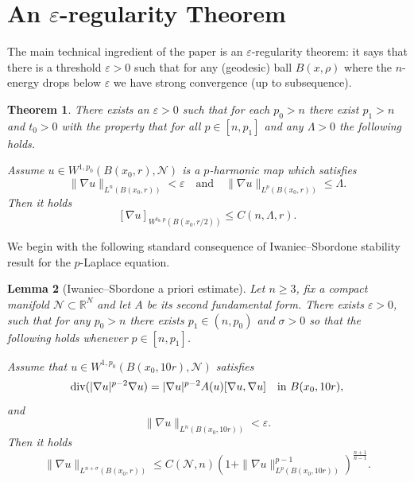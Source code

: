 \documentclass[12pt]{amsart}
\def\eps{\varepsilon}
\def\B{{B}}
\def\n{{\mathcal M}}
\def\n{{\mathcal{M}}}
\def\n{{\mathcal N}}
\renewcommand{\div}{{\rm div}}
\newtheorem{theorem}{Theorem}
\newtheorem{lemma}[theorem]{Lemma}
\newcommand{\R}{\mathbb{R}}
\newcommand{\brac}[1]{\left (#1 \right )}
\numberwithin{theorem}{section} \numberwithin{equation}{section}
\begin{document}
\section{An \texorpdfstring{$\eps$}{eps}-regularity Theorem}\label{s:epsreg}
The main technical ingredient of the paper is an $\eps$-regularity theorem: it says that there is a threshold $\eps > 0$ such that for any (geodesic) ball $B(x,\rho)$ where the $n$-energy drops below $\eps$ we have strong convergence (up to subsequence).

\begin{theorem}\label{th:epsreg}
There exists an $\eps > 0$ such that for each $p_0>n$ there exist $p_1 > n$ and $t_0 > 0$ with the property that for all $p \in [n,p_1]$ and any $\Lambda > 0$ the following holds.

Assume $u \in W^{1,p_0}(B(x_0,r),\n)$ is a $p$-harmonic map which satisfies
\[
 \|\nabla u\|_{L^n(B(x_0,r))} < \eps \quad \text{and} \quad
\|\nabla u\|_{L^p(B(x_0,r))} \leq \Lambda.
\]
Then it holds
\[
 [\nabla u]_{W^{t_0,p}(B(x_0,r/2))} \leq C(n,\Lambda,r).
\]
\end{theorem}

We begin with the following standard consequence of Iwaniec--Sbordone stability result \cite[Theorem 4]{Iwaniec-Sbordone} for the $p$-Laplace equation.
\begin{lemma}[Iwaniec--Sbordone a priori estimate]\label{la:iwaniec}
Let $n\geq 3$, fix a compact manifold $\n\subset \R^N$ and let $A$ be its second fundamental form. There exists $\eps > 0$, such that for any $p_0 > n$ there exists $p_1\in(n,p_0)$ and $\sigma > 0$ so that the following holds whenever $p \in [n,p_1]$.

Assume that $u \in W^{1,p_0}(B(x_0,10r),\n)$ satisfies
\begin{equation}\label{eq:pharm}
 \div(|\nabla u|^{p-2} \nabla u) = |\nabla u|^{p-2} A(u)[\nabla u,\nabla u] \quad \text{in $\B(x_0,10r)$},
\end{equation} 
and 
\begin{equation}\label{eq:smallnessassumption}
 \|\nabla u\|_{L^n(B(x_0,10r))} < \eps.
\end{equation}
Then it holds
\[
 \|\nabla u\|_{L^{n+\sigma}(B(x_0,r))} \leq C(\n,n)\brac{1+\|\nabla u\|_{L^{p}(B(x_0,10r))}^{p-1}}^{\frac{n+1}{n-1}} .
\]
\end{lemma}
\end{document}
